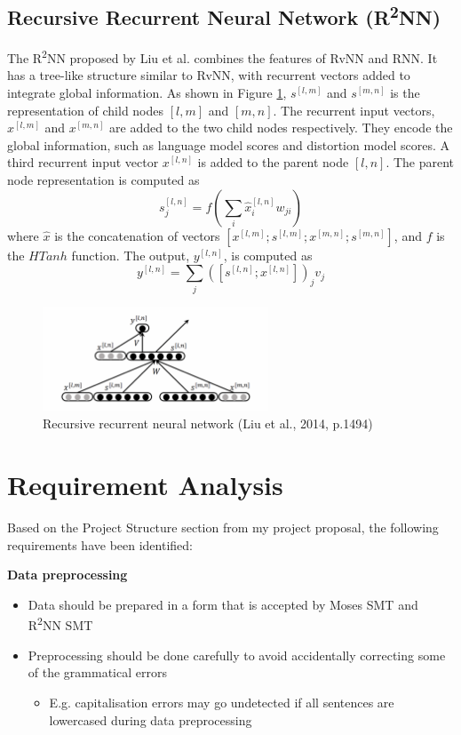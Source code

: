 \documentclass[12pt,a4paper,twoside,openright]{report}
\begin{document}
\subsection{\texorpdfstring{Recursive Recurrent Neural Network (R\textsuperscript{2}NN)}{Recursive Recurrent Neural Network (R2NN)}}
The R\textsuperscript{2}NN proposed by Liu et al.\cite{r2nn} combines the features of RvNN and RNN. It has a tree-like structure similar to RvNN, with recurrent vectors added to integrate global information. As shown in Figure \ref{fig:r2nn}, $s^{[l, m]}$ and $s^{[m, n]}$ is the representation of child nodes $[l, m]$ and $[m, n]$. The recurrent input vectors, $x^{[l, m]}$ and $x^{[m, n]}$ are added to the two child nodes respectively. They encode the global information, such as language model scores and distortion model scores. A third recurrent input vector $x^{[l, n]}$ is added to the parent node $[l, n]$. The parent node representation is computed as
\[ s_j^{[l, n]} = f(\sum_{i} \hat{x}_i^{[l, n]}w_{ji}) \]
where $\hat{x}$ is the concatenation of vectors $[x^{[l, m]}; s^{[l, m]}; x^{[m, n]}; s^{[m, n]}]$, and $f$ is the $HTanh$ function. The output, $y^{[l, n]}$, is computed as
\[ y^{[l, n]} = \sum_{j} ([s^{[l, n]}; x^{[l, n]}])_{j}v_j \]


\begin{figure}[ht]
\centering
\includegraphics[width=0.6\textwidth]{images/r2nn.png}
\caption{Recursive recurrent neural network (Liu et al., 2014, p.1494)}
\label{fig:r2nn}
\end{figure}


\section{Requirement Analysis}

Based on the Project Structure section from my project proposal, the following requirements have been identified:

\textbf{Data preprocessing}
\begin{itemize}
    \item Data should be prepared in a form that is accepted by Moses SMT and R\textsuperscript{2}NN SMT
    \item Preprocessing should be done carefully to avoid accidentally correcting some of the grammatical errors 
    
    \begin{itemize}
        \item E.g. capitalisation errors may go undetected if all sentences are lowercased during data preprocessing
    \end{itemize}
\end{itemize}
\end{document}
